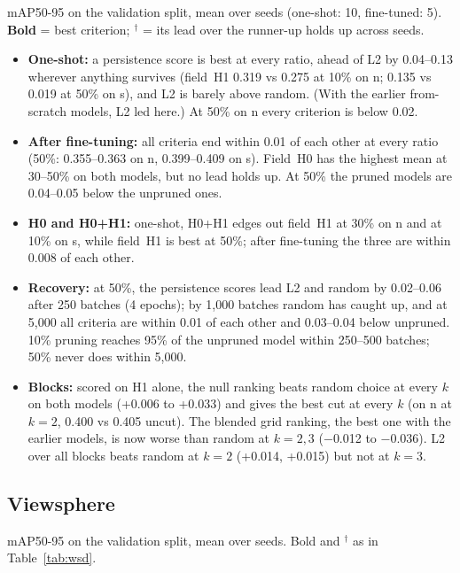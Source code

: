 \documentclass[10pt]{article}
\newcommand{\tnote}[1]{\par\vspace{3pt}\begin{minipage}{\linewidth}\footnotesize #1\end{minipage}}  %
\newcommand{\tbl}[1]{\adjustbox{max width=\linewidth}{}}
\begin{document}
\begin{table}[H]
\centering\small
\caption{WSD: channel pruning by criterion}
\label{tab:wsd}
\tbl{wsd_channel}
\tnote{mAP50-95 on the validation split, mean over seeds (one-shot: 10, fine-tuned: 5).
\textbf{Bold} = best criterion; $^\dagger$ = its lead over the runner-up holds up across
seeds.}
\end{table}

\begin{itemize}
\item \textbf{One-shot:} a persistence score is best at every ratio, ahead of L2 by 0.04--0.13
  wherever anything survives (field~H1 0.319 vs 0.275 at 10\% on n; 0.135 vs 0.019 at 50\% on s), and
  L2 is barely above random. (With the earlier from-scratch models, L2 led here.) At 50\% on n every
  criterion is below 0.02.
\item \textbf{After fine-tuning:} all criteria end within 0.01 of each other at every ratio (50\%:
  0.355--0.363 on n, 0.399--0.409 on s). Field~H0 has the highest mean at 30--50\% on both models, but
  no lead holds up. At 50\% the pruned models are 0.04--0.05 below the unpruned ones.
\item \textbf{H0 and H0+H1:} one-shot, H0+H1 edges out field~H1 at 30\% on n and at 10\% on s, while
  field~H1 is best at 50\%; after fine-tuning the three are within 0.008 of each other.
\item \textbf{Recovery:} at 50\%, the persistence scores lead L2 and random by 0.02--0.06 after 250
  batches (4 epochs); by 1,000 batches random has caught up, and at 5,000 all criteria are within 0.01
  of each other and 0.03--0.04 below unpruned. 10\% pruning reaches 95\% of the unpruned model within
  250--500 batches; 50\% never does within 5,000.
\item \textbf{Blocks:} scored on H1 alone, the null ranking beats random choice at every $k$ on both
  models (+0.006 to +0.033) and gives the best cut at every $k$ (on n at $k = 2$, 0.400 vs 0.405 uncut).
  The blended grid ranking, the best one with the earlier models, is now worse than random at
  $k = 2, 3$ ($-$0.012 to $-$0.036). L2 over all blocks beats random at $k = 2$ (+0.014, +0.015) but
  not at $k = 3$.
\end{itemize}

\subsection{Viewsphere}

\begin{table}[H]
\centering\small
\caption{Viewsphere: channel pruning by criterion}
\tbl{viewsphere_channel}
\tnote{mAP50-95 on the validation split, mean over seeds. Bold and $^\dagger$ as in
Table~\ref{tab:wsd}.}
\end{table}
\end{document}
